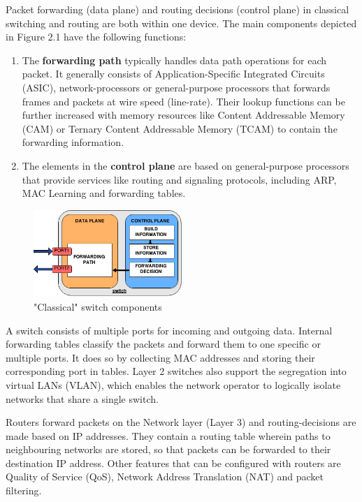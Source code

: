 Packet forwarding (data plane) and routing decisions (control plane) in classical switching and routing are both within one device. The main components depicted in Figure 2.1 have the following functions:
\begin{enumerate}
\item The \textbf{forwarding path} typically handles data path operations for each packet. It generally consists of Application-Specific Integrated Circuits (ASIC), network-processors or general-purpose processors that forwards frames and packets at wire speed (line-rate). Their lookup functions can be further increased with memory resources like Content Addressable Memory (CAM) or Ternary Content Addressable Memory (TCAM) to contain the forwarding information.
\item The elements in the \textbf{control plane} are based on general-purpose processors that provide services like routing and signaling protocols, including ARP, MAC Learning and forwarding tables.
\end{enumerate}

\begin{figure}[H]
\centering

\includegraphics[width=0.5\textwidth]{images/fundamentals/switch_components}

\caption{"Classical" switch components}
\end{figure}

A switch consists of multiple ports for incoming and outgoing data. Internal forwarding tables classify the packets and forward them to one specific or multiple ports. It does so by collecting MAC addresses and storing their corresponding port in tables. Layer 2 switches also support the segregation into virtual LANs (VLAN), which enables the network operator to logically isolate networks that share a single switch.

Routers forward packets on the Network layer (Layer 3) and routing-decisions are made based on IP addresses. They contain a routing table wherein paths to neighbouring networks are stored, so that packets can be forwarded to their destination IP address. Other features that can be configured with routers are Quality of Service (QoS), Network Address Translation (NAT) and packet filtering.

